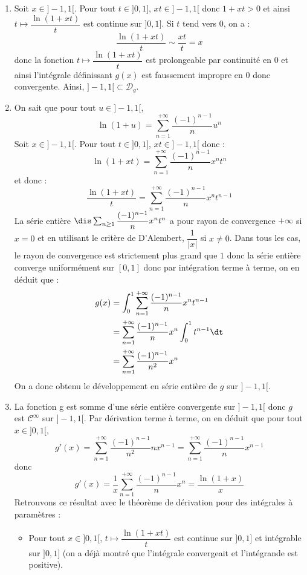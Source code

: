\documentclass[a4paper,10pt]{report}
\begin{document}
\corr \begin{enumerate}
\item Soit $x \in ]-1,1[$. Pour tout $t \in ]0,1]$, $xt \in ]-1,1[$ donc $1+xt >0$ et ainsi $t \mapsto \dfrac{\ln(1+xt)}{t} $ est continue sur $]0,1]$. Si $t$ tend vers $0$, on a :
$$ \dfrac{\ln(1+xt)}{t}  \sim \dfrac{xt}{t}= x$$
donc la fonction $t \mapsto \dfrac{\ln(1+xt)}{t} $ est prolongeable par continuité en $0$ et ainsi l'intégrale définissant $g(x)$ est faussement impropre en $0$ donc convergente. Ainsi, $]-1,1[ \subset \mathcal{D}_g$.
\item On sait que pour tout $u \in ]-1,1[$,
$$ \ln(1+u) = \sum_{n=1}^{+ \infty} \dfrac{(-1)^{n-1}}{n} u^n$$
Soit $x \in ]-1,1[$. Pour tout $t \in ]0,1]$, $xt \in ]-1,1[$ donc :
$$ \ln(1+xt) = \sum_{n=1}^{+ \infty} \dfrac{(-1)^{n-1}}{n} x^n t^n$$
et donc :
$$ \dfrac{\ln(1+xt)}{t} = \sum_{n=1}^{+ \infty} \dfrac{(-1)^{n-1}}{n} x^n t^{n-1}$$
La série entière $\dis \sum_{n \geq 1} \dfrac{(-1)^{n-1}}{n} x^n t^n$ a pour rayon de convergence $+ \infty$ si $x=0$ et en utilisant le critère de D'Alembert, $\dfrac{1}{\vert x \vert}$ si $x \neq 0$. Dans tous les cas, le rayon de convergence est strictement plus grand que $1$ donc la série entière converge uniformément sur $[0,1]$ donc par intégration terme à terme, on en déduit que :
\begin{align*}
g(x) & = \int_{0}^1 \sum_{n=1}^{+ \infty} \dfrac{(-1)^{n-1}}{n} x^n t^{n-1} \\
& = \sum_{n=1}^{+ \infty} \dfrac{(-1)^{n-1}}{n} x^n \int_{0}^1 t^{n-1} \dt \\
& = \sum_{n=1}^{+ \infty} \dfrac{(-1)^{n-1}}{n^2} x^n
\end{align*} 
On a donc obtenu le développement en série entière de $g$ sur $]-1,1[$.
\item La fonction g est somme d'une série entière convergente sur $]-1,1[$ donc $g$ est $\mathcal{C}^{\infty}$ sur $]-1,1[$. Par dérivation terme à terme, on en déduit que pour tout $x \in ]0,1[$,
$$g'(x) =  \sum_{n=1}^{+ \infty} \dfrac{(-1)^{n-1}}{n^2} nx^{n-1} = \sum_{n=1}^{+ \infty} \dfrac{(-1)^{n-1}}{n} x^{n-1}$$
donc 
$$ g'(x) = \dfrac{1}{x} \sum_{n=1}^{+ \infty} \dfrac{(-1)^{n-1}}{n} x^{n} = \dfrac{\ln(1+x)}{x}$$
Retrouvons ce résultat avec le théorème de dérivation pour des intégrales à paramètres :
\begin{itemize}
\item Pour tout $x \in ]0,1[$, $t \mapsto \dfrac{\ln(1+xt)}{t}$ est continue sur $]0,1]$ et intégrable sur $]0,1]$ (on a déjà montré que l'intégrale convergeait et l'intégrande est positive).

\end{itemize}
\end{enumerate}
\end{document}
